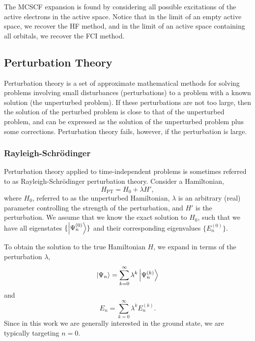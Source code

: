 The MCSCF expansion is found by considering all possible excitations of the active electrons in the active space. Notice that in the limit of an empty active space, we recover the \gls{HF} method, and in the limit of an active space containing all orbitals, we recover the \gls{FCI} method.


\subsection{Perturbation Theory}
\label{sec:perturbation-theory}

Perturbation theory is a set of approximate mathematical methods for solving problems involving small disturbances (perturbations) to a problem with a known solution (the unperturbed problem). If these perturbations are not too large, then the solution of the perturbed problem is close to that of the unperturbed problem, and can be expressed as the solution of the unperturbed problem plus some corrections. Perturbation theory fails, however, if the perturbation is large.

\subsubsection{Rayleigh-Schr\"odinger}

Perturbation theory applied to time-independent problems is sometimes referred to as Rayleigh-Schr\"odinger perturbation theory.\cite{sakuraiModern2017,rayleighTheory1945,schrodingerQuantisierung1926} Consider a Hamiltonian,
\begin{equation}
H_\mathrm{PT} = H_0 + \lambda H',
\end{equation}
where $H_0$, referred to as the unperturbed Hamiltonian, $\lambda$ is an arbitrary (real) parameter controlling the strength of the perturbation, and $H'$ is the perturbation. We assume that we know the exact solution to $H_0$, such that we have all eigenstates $\{\ket{\Psi_n^{(0)}}\}$ and their corresponding eigenvalues $\{E_n^{(0)} \}$.

To obtain the solution to the true Hamiltonian $H$, we expand in terms of the perturbation $\lambda$,
\begin{equation}
\ket{\Psi_n} = \sum_{k=0}^\infty \lambda^k\ket{\Psi_n^{(k)}}
\end{equation}
and
\begin{equation}
E_n = \sum_{k=0}^\infty \lambda^kE_n^{(k)}.
\end{equation}
Since in this work we are generally interested in the ground state, we are typically targeting $n=0$.

